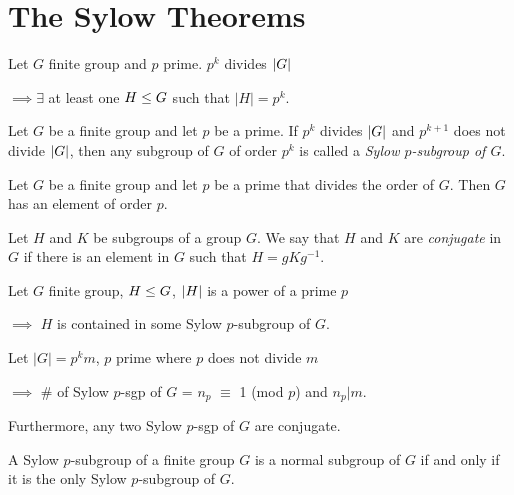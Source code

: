 \section{The Sylow Theorems}

\begin{theorem}
 Let $G$ finite group and $p$ prime. $p^k$ divides $\left\lvert G \right\rvert$

 \noindent\(\implies \exists\) at least one $H\leq G$ such that  $ |H| = p^k$.
\end{theorem}\vspace{-1em}

\begin{definition}
	Let $G$ be a finite group and let $p$ be a prime. If $p^k$ divides $\left\lvert G \right\rvert$ and $p^{k+1}$ does not divide $\left\lvert G \right\rvert$, then any subgroup of $G$ of order $p^k$ is called a \textit{Sylow $p$-subgroup of $G$}.
\end{definition}

\begin{corollary}
	Let $G$ be a finite group and let $p$ be a prime that divides the order of $G$. Then $G$ has an element of order $p$.
\end{corollary}

\begin{definition}
	Let $H$ and $K$ be subgroups of a group $G$. We say that $H$ and $K$ are \textit{conjugate} in $G$ if there is an element in $G$ such that $H = gKg^{-1}$.
\end{definition}

\begin{theorem}
	Let \(G\) finite group, $H \leq G$, $\left\lvert H \right\rvert$ is a power of a prime $p$

  \noindent\(\implies\) $H$ is contained in some Sylow $p$-subgroup of $G$.
\end{theorem}\vspace{-1em}

\begin{theorem}
	Let \(|G| = p^k m\), $p$ prime where $p$ does not divide $m$

  \noindent\(\implies\) \# of Sylow \(p\)-sgp of $G$ = $n_p$ \(\equiv\) 1 (mod \( p\)) and $n_p | m$.

  \noindent Furthermore, any two Sylow $p$-sgp of $G$ are conjugate.
\end{theorem}

\begin{corollary}
	A Sylow $p$-subgroup of a finite group $G$ is a normal subgroup of $G$ if and only if it is the only Sylow $p$-subgroup of $G$.
\end{corollary}
